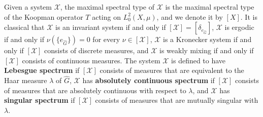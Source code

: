 \documentclass[graybox]{svmult}
\theoremstyle{definition}
\begin{document}
Given a system $\mathcal{X}$, the maximal spectral type of $\mathcal{X}$ is the maximal spectral type of the Koopman operator $T$ acting on $L^2_0(X,\mu)$, and we denote it by $[X]$.
It is classical that $\mathcal{X}$ is an invariant system if and only if $[\mathcal{X}] = [\delta_{e_{\widehat{G}}}]$, $\mathcal{X}$ is ergodic if and only if $\nu(\{e_{\widehat{G}}\}) = 0$ for every $\nu \in [\mathcal{X}]$, $\mathcal{X}$ is a Kronecker system if and only if $[\mathcal{X}]$ consists of discrete measures, and $\mathcal{X}$ is weakly mixing if and only if $[\mathcal{X}]$ consists of continuous measures. 
The system $\mathcal{X}$ is defined to have \textbf{Lebesgue spectrum} if $[\mathcal{X}]$ consists of measures that are equivalent to the Haar measure $\lambda$ of $\widehat{G}$, $\mathcal{X}$ has \textbf{absolutely continuous spectrum} if $[\mathcal{X}]$ consists of measures that are absolutely continuous with respect to $\lambda$, and $\mathcal{X}$ has \textbf{singular spectrum} if $[\mathcal{X}]$ consists of measures that are mutually singular with $\lambda$.
\end{document}
